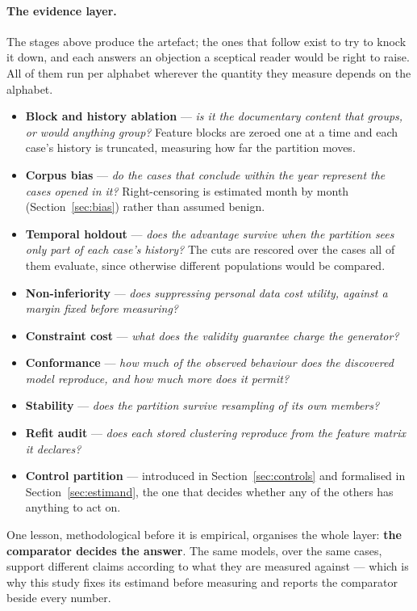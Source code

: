 \paragraph{The evidence layer.}
The stages above produce the artefact; the ones that follow exist to try to knock it down, and
each answers an objection a sceptical reader would be right to raise. All of them run per
alphabet wherever the quantity they measure depends on the alphabet.

\begin{itemize}
  \item \textbf{Block and history ablation} --- \emph{is it the documentary content that groups,
    or would anything group?} Feature blocks are zeroed one at a time and each case's history is
    truncated, measuring how far the partition moves.
  \item \textbf{Corpus bias} --- \emph{do the cases that conclude within the year represent the
    cases opened in it?} Right-censoring is estimated month by month (Section~\ref{sec:bias})
    rather than assumed benign.
  \item \textbf{Temporal holdout} --- \emph{does the advantage survive when the partition sees
    only part of each case's history?} The cuts are rescored over the cases all of them evaluate,
    since otherwise different populations would be compared.
  \item \textbf{Non-inferiority} --- \emph{does suppressing personal data cost utility, against a
    margin fixed before measuring?}
  \item \textbf{Constraint cost} --- \emph{what does the validity guarantee charge the
    generator?}
  \item \textbf{Conformance} --- \emph{how much of the observed behaviour does the discovered
    model reproduce, and how much more does it permit?}
  \item \textbf{Stability} --- \emph{does the partition survive resampling of its own members?}
  \item \textbf{Refit audit} --- \emph{does each stored clustering reproduce from the feature
    matrix it declares?}
  \item \textbf{Control partition} --- introduced in Section~\ref{sec:controls} and formalised in
    Section~\ref{sec:estimand}, the one that decides whether any of the others has anything to
    act on.
\end{itemize}

One lesson, methodological before it is empirical, organises the whole layer: \textbf{the
comparator decides the answer}. The same models, over the same cases, support different claims
according to what they are measured against --- which is why this study fixes its estimand before
measuring and reports the comparator beside every number.

